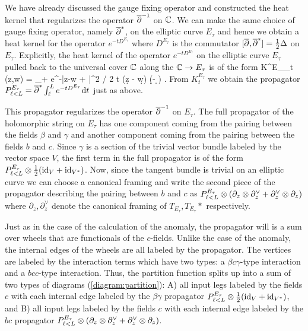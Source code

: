 We have already discussed the gauge fixing operator and constructed the heat kernel that regularizes the operator $\overline{\partial}^{-1}$ on $\mathbb C$. 
We can make the same choice of gauge fixing operator, namely $\overline{\partial}^*$, on the elliptic curve $E_\tau$ and hence we obtain a heat kernel for the operator $e^{-t D^{E_\tau}}$ where $D^{E_\tau}$ is the commutator $[\overline{\partial}, \overline{\partial}^*] = \frac{1}{2} \Delta$ on $E_\tau$. 
Explicitly, the heat kernel of the operator $e^{-t D^{E_\tau}}$ on the elliptic curve $E_\tau$ pulled back to the universal cover $\mathbb C$ along the $\mathbb C \to E_\tau$ is of the form
\ben 
K^{E_\tau}_t (z,w) = \sum_{\lambda \in \ZZ + \tau \ZZ}  e^{-|z-w + \lambda|^2 / 2 t} (\d z - \d w) (\d \zbar - \d \wbar ) .
\een
From $K_t^{E_\tau}$ we obtain the propagator $P_{\ell < L}^{E_\tau} = \overline{\partial}^* \int_{\ell}^L e^{-t D^{E_\tau}} {\rm d} t$ just as above. 

This propagator regularizes the operator $\overline{\partial}^{-1}$ on $E_\tau$. 
The full propagator of the holomorphic string on $E_\tau$ has one component coming from the pairing between the fields $\beta$ and $\gamma$ and another component coming from the pairing between the fields $b$ and $c$. 
Since $\gamma$ is a section of the trivial vector bundle labeled by the vector space $V$, the first term in the full propagator is of the form $P_{\ell < L}^{E_\tau} \otimes \frac{1}{2} ({\rm id}_V + {\rm id}_{V^*})$.
Now, since the tangent bundle is trivial on an elliptic curve we can choose a canonical framing and write the second piece of the propagator describing the pairing between $b$ and $c$ as $P_{\ell < L}^{E_\tau} \otimes (\partial_z \otimes \partial_z^\vee + \partial_z^\vee \otimes \partial_z)$ where $\partial_z, \partial_z^\vee$ denote the canonical framing of $T_{E_\tau}, T_{E_\tau}*$ respectively. 

Just as in the case of the calculation of the anomaly, the propagator will is a sum over wheels that are functionals of the $c$-fields. 
Unlike the case of the anomaly, the internal edges of the wheels are all labeled by the propagator. 
The vertices are labeled by the interaction terms which have two types: a $\beta c \gamma$-type interaction and a $bcc$-type interaction. 
Thus, the partition function splits up into a sum of two types of diagrams (\ref{diagram:partition}): A) all input legs labeled by the fields $c$ with each internal edge labeled by the $\beta\gamma$ propagator $P_{\ell < L}^{E_\tau} \otimes \frac{1}{2} ({\rm id}_V + {\rm id}_{V^*})$, and B) all input legs labeled by the fields $c$ with each internal edge labeled by the $bc$ propagator $P_{\ell < L}^{E_\tau} \otimes (\partial_z \otimes \partial_z^\vee + \partial_z^\vee \otimes \partial_z)$. 

